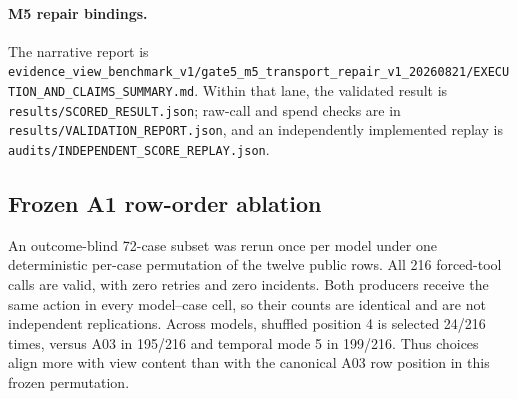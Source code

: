 \documentclass{article}
\begin{document}
\paragraph{M5 repair bindings.}
The narrative report is
\nolinkurl{evidence_view_benchmark_v1/gate5_m5_transport_repair_v1_20260821/EXECUTION_AND_CLAIMS_SUMMARY.md}.
Within that lane, the validated result is \nolinkurl{results/SCORED_RESULT.json}; raw-call and
spend checks are in \nolinkurl{results/VALIDATION_REPORT.json}, and an independently implemented
replay is \nolinkurl{audits/INDEPENDENT_SCORE_REPLAY.json}.

\subsection{Frozen A1 row-order ablation}
\label{sec:row-order-ablation}

An outcome-blind 72-case subset was rerun once per model under one deterministic per-case
permutation of the twelve public rows. All 216 forced-tool calls are valid, with zero retries and
zero incidents. Both producers receive the same action in every model--case cell, so their counts
are identical and are not independent replications. Across models, shuffled position 4 is selected
24/216 times, versus A03 in 195/216 and temporal mode 5 in 199/216. Thus choices align more with
view content than with the canonical A03 row position in this frozen permutation.

\begin{table}[ht]
\centering\scriptsize
\caption{A1 row-order ablation per producer. FP is on 60 in-library cases per model; canonical and
shuffled counts are paired descriptive comparisons. The total has 60 unique cases repeated across
three models, not 180 independent cases.}
\label{tab:row-order-ablation}
\end{table}
\end{document}

